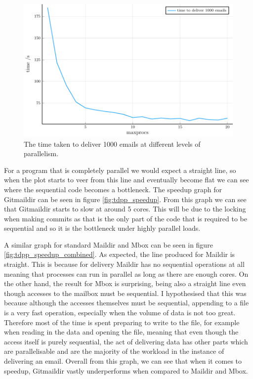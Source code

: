 \begin{figure}[h]
    \centering
    \includegraphics{figs/tdpp}
    \caption{The time taken to deliver 1000 emails at different levels of parallelism.}
    \label{fig:tdpp}
\end{figure}

For a program that is completely parallel we would expect a straight line, so when the plot starts to veer from this line and eventually become flat we can see where the sequential code becomes a bottleneck. The speedup graph for Gitmaildir can be seen in figure \ref{fig:tdpp_speedup}. From this graph we can see that Gitmaildir starts to slow at around 5 cores. This will be due to the locking when making commits as that is the only part of the code that is required to be sequential and so it is the bottleneck under highly parallel loads.

A similar graph for standard Maildir and Mbox can be seen in figure \ref{fig:tdpp_speedup_combined}. As expected, the line produced for Maildir is straight. This is because for delivery Maildir has no sequential operations at all meaning that processes can run in parallel as long as there are enough cores. On the other hand, the result for Mbox is surprising, being also a straight line even though accesses to the mailbox must be sequential. I hypothesised that this was because although the accesses themselves must be sequential, appending to a file is a very fast operation, especially when the volume of data is not too great. Therefore most of the time is spent preparing to write to the file, for example when reading in the data and opening the file, meaning that even though the access itself is purely sequential, the act of delivering data has other parts which are parallelisable and are the majority of the workload in the instance of delivering an email. Overall from this graph, we can see that when it comes to speedup, Gitmaildir vastly underperforms when compared to Maildir and Mbox.

